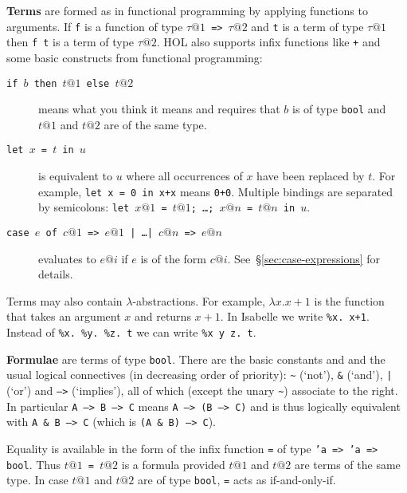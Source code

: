 \textbf{Terms}
are formed as in functional programming by applying functions to
arguments. If \texttt{f} is a function of type \texttt{$\tau@1$ => $\tau@2$}
and \texttt{t} is a term of type $\tau@1$ then \texttt{f~t} is a term of type
$\tau@2$. HOL also supports infix functions like \texttt{+} and some basic
constructs from functional programming:
\begin{description}
\item[\texttt{if $b$ then $t@1$ else $t@2$}]
means what you think it means and requires that
$b$ is of type \texttt{bool} and $t@1$ and $t@2$ are of the same type.
\item[\texttt{let $x$ = $t$ in $u$}]
is equivalent to $u$ where all occurrences of $x$ have been replaced by
$t$. For example,
\texttt{let x = 0 in x+x} means \texttt{0+0}. Multiple bindings are separated
by semicolons: \texttt{let $x@1$ = $t@1$; \dots; $x@n$ = $t@n$ in $u$}.
\item[\texttt{case $e$ of $c@1$ => $e@1$ | \dots | $c@n$ => $e@n$}]
evaluates to $e@i$ if $e$ is of the form
$c@i$. See~\S\ref{sec:case-expressions} for details.
\end{description}

Terms may also contain $\lambda$-abstractions. For example, $\lambda
x. x+1$ is the function that takes an argument $x$ and returns $x+1$. In
Isabelle we write \texttt{\%x.~x+1}.
Instead of \texttt{\%x.~\%y.~\%z.~t} we can write \texttt{\%x~y~z.~t}.

\textbf{Formulae}
are terms of type \texttt{bool}. There are the basic
constants  and  and the usual logical
connectives (in decreasing order of priority):
\verb$~$ (`not'),
\texttt{\&} (`and'),
\texttt{|} (`or') and
\texttt{-->} (`implies'),
all of which (except the unary \verb$~$) associate to the right. In
particular \texttt{A --> B --> C} means \texttt{A --> (B --> C)} and is thus
logically equivalent with \texttt{A \& B --> C}
(which is \texttt{(A \& B) --> C}).

Equality is available in the form of the infix function
\texttt{=} of type \texttt{'a => 'a => bool}. Thus \texttt{$t@1$ = $t@2$} is
a formula provided $t@1$ and $t@2$ are terms of the same type. In case $t@1$
and $t@2$ are of type \texttt{bool}, \texttt{=} acts as if-and-only-if.

